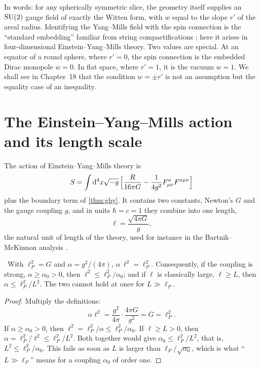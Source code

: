 In words: for any spherically symmetric slice, the geometry itself supplies an $\mathrm{SU}(2)$ gauge field of exactly the Witten form, with $w$ equal to the slope $r'$ of the areal radius. Identifying the Yang--Mills field with the spin connection is the ``standard embedding'' familiar from string compactifications \cite{CHSW1985}; here it arises in four-dimensional Einstein--Yang--Mills theory. Two values are special. At an equator of a round sphere, where $r'=0$, the spin connection is the embedded Dirac monopole $w=0$. In flat space, where $r'=1$, it is the vacuum $w=1$. We shall see in Chapter~18 that the condition $w=\pm r'$ is not an assumption but the equality case of an inequality.

\section{The Einstein--Yang--Mills action and its length scale}

The action of Einstein--Yang--Mills theory is
\begin{equation}\label{eq:eymaction}
S=\int\mathrm{d}^4x\sqrt{-g}\,\Bigl[\frac{R}{16\pi G}-\frac1{4g^2}F^a_{\mu\nu}F^{a\mu\nu}\Bigr]
\end{equation}
plus the boundary term of \cref{thm:ghy}. It contains two constants, Newton's $G$ and the gauge coupling $g$, and in units $\hbar=c=1$ they combine into one length,
\begin{equation}\label{eq:elldef}
\ell=\frac{\sqrt{4\pi G}}{g},
\end{equation}
the natural unit of length of the theory, used for instance in the Bartnik--McKinnon analysis \cite{BartnikMcKinnon1988,VolkovGaltsov1999}.

\begin{proposition}\label{prop:ellsize}\ver\
With $\ell_P^2=G$ and $\alpha=g^2/(4\pi)$, $\alpha\,\ell^2=\ell_P^2$. Consequently, if the coupling is strong, $\alpha\ge\alpha_0>0$, then $\ell^2\le\ell_P^2/\alpha_0$; and if $\ell$ is classically large, $\ell\ge L$, then $\alpha\le\ell_P^2/L^2$. The two cannot hold at once for $L\gg\ell_P$.
\end{proposition}
\begin{proof}
Multiply the definitions:
\[
\alpha\ell^2=\frac{g^2}{4\pi}\cdot\frac{4\pi G}{g^2}=G=\ell_P^2 .
\]
If $\alpha\ge\alpha_0>0$, then $\ell^2=\ell_P^2/\alpha\le\ell_P^2/\alpha_0$. If $\ell\ge L>0$, then $\alpha=\ell_P^2/\ell^2\le\ell_P^2/L^2$. Both together would give $\alpha_0\le\ell_P^2/L^2$, that is, $L^2\le\ell_P^2/\alpha_0$. This fails as soon as $L$ is larger than $\ell_P/\sqrt{\alpha_0}$, which is what ``$L\gg\ell_P$'' means for a coupling $\alpha_0$ of order one.
\end{proof}


